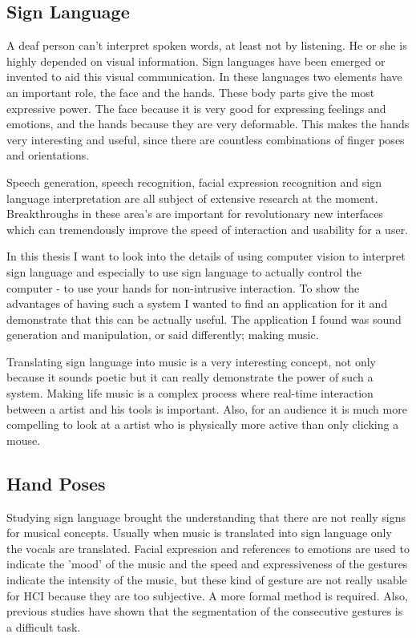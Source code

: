 \subsection*{Sign Language}

A deaf person can't interpret spoken words, at least not by listening. He or she is highly depended on visual information. Sign languages have been emerged or invented to aid this visual communication. In these languages two elements have an important role, the face and the hands. These body parts give the most expressive power. The face because it is very good for expressing feelings and emotions, and the hands because they are very deformable. This makes the hands very interesting and useful, since there are countless combinations of finger poses and orientations. 

Speech generation, speech recognition, facial expression recognition and sign language interpretation are all subject of extensive research at the moment. Breakthroughs in these area's are important for revolutionary new interfaces which can tremendously improve the speed of interaction and usability for a user. 

In this thesis I want to look into the details of using computer vision to interpret sign language and especially to use sign language to actually control the computer - to use your hands for non-intrusive interaction. To show the advantages of having such a system I wanted to find an application for it and demonstrate that this can be actually useful. The application I found was sound generation and manipulation, or said differently; making music. 

Translating sign language into music is a very interesting concept, not only because it sounds poetic but it can really demonstrate the power of such a system. Making life music is a complex process where real-time interaction between a artist and his tools is important. Also, for an audience it is much more compelling to look at a artist who is physically more active than only clicking a mouse.

\subsection*{Hand Poses}
Studying sign language brought the understanding that there are not really signs for musical concepts. Usually when music is translated into sign language only the vocals are translated. Facial expression and references to emotions are used to indicate the 'mood' of the music and the speed and expressiveness of the gestures indicate the intensity of the music, but these kind of gesture are not really usable for HCI because they are too subjective. A more formal method is required. Also, previous studies have shown that the segmentation of the consecutive gestures is a difficult task\cite{Buehler2009}.

